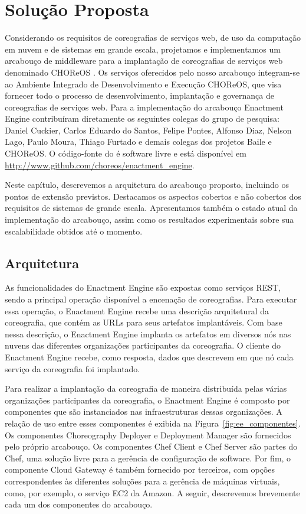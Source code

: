 
\chapter{Solução Proposta}
\label{cap:solucao}

Considerando os requisitos de coreografias de serviços web, de uso da computação em nuvem e de sistemas em grande escala, projetamos e implementamos um arcabouço de middleware para a implantação de coreografias de serviços web denominado CHOReOS \ee. Os serviços oferecidos pelo nosso arcabouço integram-se ao Ambiente Integrado de Desenvolvimento e Execução CHOReOS, que visa fornecer todo o processo de desenvolvimento, implantação e governança de coreografias de serviços web. Para a implementação do arcabouço Enactment Engine contribuíram diretamente os seguintes colegas do grupo de pesquisa: Daniel Cuckier, Carlos Eduardo do Santos, Felipe Pontes, Alfonso Diaz, Nelson Lago, Paulo Moura, Thiago Furtado e demais colegas dos projetos Baile e CHOReOS. O código-fonte do \ee é software livre 
e está disponível em \url{http://www.github.com/choreos/enactment\_engine}. 

Neste capítulo, descrevemos a arquitetura do arcabouço proposto, incluindo os pontos de extensão previstos. Destacamos os aspectos cobertos e não cobertos dos requisitos de sistemas de grande escala. Apresentamos também o estado atual da implementação do arcabouço, assim como os resultados experimentais sobre sua escalabilidade obtidos até o momento.

\section{Arquitetura}
\label{sec:arquitetura}

As funcionalidades do Enactment Engine são expostas como serviços REST, sendo a principal operação disponível a encenação de coreografias. Para executar essa operação, o Enactment Engine recebe uma descrição arquitetural da coreografia, que contém as URLs para seus artefatos implantáveis. Com base nessa descrição, o Enactment Engine implanta os artefatos em diversos nós nas nuvens das diferentes organizações participantes da coreografia. O cliente do Enactment Engine recebe, como resposta, dados que descrevem em que nó cada serviço da coreografia foi implantado.

Para realizar a implantação da coreografia de maneira distribuída pelas várias organizações participantes da coreografia, o Enactment Engine é composto por  componentes que são instanciados nas infraestruturas dessas organizações. A relação de uso entre esses componentes é exibida na Figura~\ref{fig:ee_componentes}. Os componentes Choreography Deployer e Deployment Manager são fornecidos pelo próprio arcabouço. Os componentes Chef Client e Chef Server são partes do Chef, uma solução livre para a gerência de configuração de software. Por fim, o componente Cloud Gateway é também fornecido por terceiros, com opções correspondentes às diferentes soluções para a gerência de máquinas virtuais, como, por exemplo, o serviço EC2 da Amazon. A seguir, descrevemos brevemente cada um dos componentes do arcabouço.

